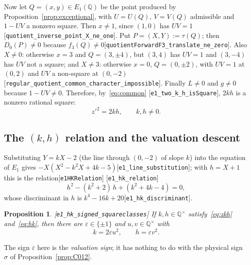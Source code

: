 \documentclass[10pt]{article}
\newtheorem{proposition}[theorem]{Proposition}
\theoremstyle{definition}
\theoremstyle{remark}
\newcommand{\Q}{\mathbb{Q}}
\newcommand{\leanref}[1]{{\scriptsize\textup{[\texttt{#1}]}}\allowbreak}
\begin{document}
Now let $Q=(x,y)\in E_1(\Q)$ be the point produced by
Proposition~\ref{prop:exceptional}, with $U=U(Q)$, $V=V(Q)$ admissible and
$1-UV$ a nonzero square.  Then $x\ne1$, since $(1,0)$ has $UV=1$
\leanref{quotient\_\allowbreak inverse\_\allowbreak point\_\allowbreak X\_\allowbreak ne\_\allowbreak one}.  Put $P=(X,Y):=\tau(Q)$; then
$D_0(P)\ne0$ because $f_3(Q)\ne0$\leanref{quotient\allowbreak Forward\allowbreak F3\_\allowbreak translate\_\allowbreak ne\_\allowbreak zero}.
Also $X\ne0$: otherwise $x=3$ and $Q=(3,\pm4)$, but $(3,4)$ has $UV=1$ and
$(3,-4)$ has $UV$ not a square; and $X\ne3$: otherwise $x=0$, $Q=(0,\pm2)$,
with $UV=1$ at $(0,2)$ and $UV$ a non-square at $(0,-2)$
\leanref{regular\_\allowbreak quotient\_\allowbreak common\_\allowbreak character\_\allowbreak impossible}.  Finally $L\ne0$ and
$g\ne0$ because $1-UV\ne0$.  Therefore, by~\eqref{eq:common}
\leanref{e1\_\allowbreak two\_\allowbreak k\_\allowbreak h\_\allowbreak is\allowbreak Square}, $2kh$ is a nonzero rational square:
\begin{equation}\label{eq:zkh}
 z'^2=2kh,\qquad k,h\ne0 .
\end{equation}

\subsection{The \texorpdfstring{$(k,h)$}{(k,h)} relation and the valuation descent}\label{sec:valuation-descent}

Substituting $Y=kX-2$ (the line through $(0,-2)$ of slope $k$) into the
equation of $E_1$ gives $-X(X^2-k^2X+4k-5)$\leanref{e1\_\allowbreak line\_\allowbreak substitution};
with $h=X+1$ this is the relation\leanref{e1\allowbreak HKRelation} \leanref{e1\_\allowbreak hk\_\allowbreak relation}
\begin{equation}\label{eq:hk}
 h^2-(k^2+2)\,h+(k^2+4k-4)=0 ,
\end{equation}
whose discriminant in $h$ is $k^4-16k+20$\leanref{e1\_\allowbreak hk\_\allowbreak discriminant}.

\begin{proposition}\label{prop:valuation}
\leanref{e1\_\allowbreak hk\_\allowbreak signed\_\allowbreak squareclasses}
If $k,h\in\Q^\times$ satisfy~\eqref{eq:zkh} and~\eqref{eq:hk}, then there are
$\varepsilon\in\{\pm1\}$ and $u,v\in\Q^\times$ with
\[
 k=2\varepsilon u^2,\qquad h=\varepsilon v^2 .
\]
\end{proposition}
The sign $\varepsilon$ here is the \emph{valuation sign}; it has nothing to do
with the physical sign $\sigma$ of Proposition~\ref{prop:C012}.
\end{document}
